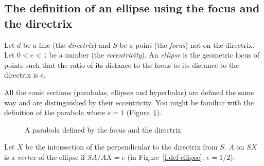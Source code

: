 
\subsection{The definition of an ellipse using the focus and the directrix}

\begin{definition}
Let $d$ be a line (the \emph{directrix}) and $S$ be a point (the \emph{focus}) not on the directrix. Let $0<e<1$ be a number (the \emph{eccentricity}). An \emph{ellipse} is the geometric locus of points such that the ratio of its distance to the focus to its distance to the directrix is $e$.
\end{definition}

All the conic sections (parabolas, ellipses and hyperbolas) are defined the same way and are distinguished by their eccentricity. You might be familiar with the definition of the parabola where $e=1$ (Figure~\ref{f.parabola}).

\begin{figure}[b]
\begin{center}
\end{center}
\caption{A parabola defined by the focus and the directrix}\label{f.parabola}
\end{figure}

\begin{definition}
Let $X$ be the intersection of the perpendicular to the directrix from $S$. $A$ on $SX$ is a \emph{vertex} of the ellipse if $SA/AX=e$ (in Figure~\ref{f.def-ellipse}, $e=1/2$).
\end{definition}


